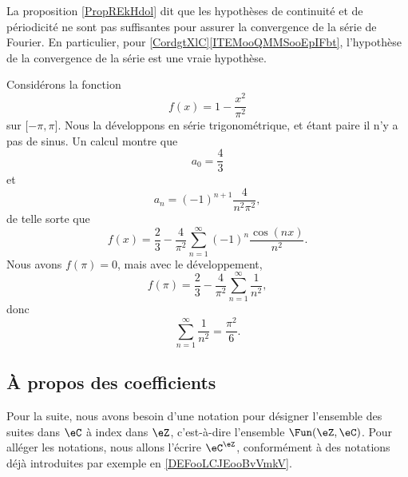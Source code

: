 \begin{normaltext}
	La proposition \ref{PropREkHdol} dit que les hypothèses de continuité et de périodicité ne sont pas suffisantes pour assurer la convergence de la série de Fourier. En particulier, pour \ref{CordgtXlC}\ref{ITEMooQMMSooEpIFbt}, l'hypothèse de la convergence de la série est une vraie hypothèse.
\end{normaltext}

\begin{example}
	Considérons la fonction
	\begin{equation}
		f(x)=1-\frac{ x^2 }{ \pi^2 }
	\end{equation}
	sur \( \mathopen[ -\pi , \pi \mathclose]\). Nous la développons en série trigonométrique, et étant paire il n'y a pas de sinus. Un calcul montre que
	\begin{equation}
		a_0=\frac{ 4 }{ 3 }
	\end{equation}
	et
	\begin{equation}
		a_n=(-1)^{n+1}\frac{ 4 }{ n^2\pi^2 },
	\end{equation}
	de telle sorte que
	\begin{equation}
		f(x)=\frac{ 2 }{ 3 }-\frac{ 4 }{ \pi^2 }\sum_{n=1}^{\infty}(-1)^n\frac{ \cos(nx) }{ n^2 }.
	\end{equation}
	Nous avons \( f(\pi)=0\), mais avec le développement,
	\begin{equation}
		f(\pi)=\frac{ 2 }{ 3 }-\frac{ 4 }{ \pi^2 }\sum_{n=1}^{\infty}\frac{1}{ n^2 },
	\end{equation}
	donc
	\begin{equation}
		\sum_{n=1}^{\infty}\frac{1}{ n^2 }=\frac{ \pi^2 }{ 6 }.
	\end{equation}
\end{example}


\subsection{À propos des coefficients}

Pour la suite, nous avons besoin d'une notation pour désigner l'ensemble des suites dans \( \eC\) à index dans \( \eZ\), c'est-à-dire l'ensemble \( \Fun(\eZ,\eC)\). Pour alléger les notations, nous allons l'écrire \( \eC^{\eZ}\), conformément à des notations déjà introduites par exemple en \ref{DEFooLCJEooBvVmkV}.

